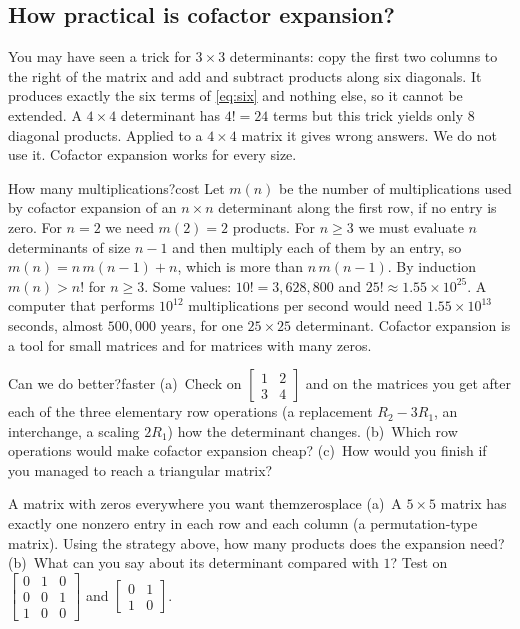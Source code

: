 \documentclass[11pt]{article}
\begin{document}
\subsection*{How practical is cofactor expansion?}

\begin{warn}
You may have seen a trick for $3\times3$ determinants: copy the first two columns to the right of the matrix and add and subtract products along six diagonals. It produces exactly the six terms of \eqref{eq:six} and nothing else, so it cannot be extended. A $4\times4$ determinant has $4!=24$ terms but this trick yields only $8$ diagonal products. Applied to a $4\times4$ matrix it gives wrong answers. We do not use it. Cofactor expansion works for every size.
\end{warn}

\begin{exmp}{How many multiplications?}{cost}
Let $m(n)$ be the number of multiplications used by cofactor expansion of an $n\times n$ determinant along the first row, if no entry is zero. For $n=2$ we need $m(2)=2$ products. For $n\geq3$ we must evaluate $n$ determinants of size $n-1$ and then multiply each of them by an entry, so $m(n)=n\,m(n-1)+n$, which is more than $n\,m(n-1)$. By induction $m(n)>n!$ for $n\geq3$. Some values: $10!=3{,}628{,}800$ and $25!\approx1.55\times10^{25}$. A computer that performs $10^{12}$ multiplications per second would need $1.55\times10^{13}$ seconds, almost $500{,}000$ years, for one $25\times25$ determinant. Cofactor expansion is a tool for small matrices and for matrices with many zeros.
\end{exmp}

\begin{think}{Can we do better?}{faster}
(a)~Check on $\begin{bmatrix}1&2\\3&4\end{bmatrix}$ and on the matrices you get after each of the three elementary row operations (a replacement $R_2-3R_1$, an interchange, a scaling $2R_1$) how the determinant changes. (b)~Which row operations would make cofactor expansion cheap? (c)~How would you finish if you managed to reach a triangular matrix?
\end{think}

\begin{think}{A matrix with zeros everywhere you want them}{zerosplace}
(a)~A $5\times5$ matrix has exactly one nonzero entry in each row and each column (a permutation-type matrix). Using the strategy above, how many products does the expansion need? (b)~What can you say about its determinant compared with $1$? Test on $\begin{bmatrix}0&1&0\\0&0&1\\1&0&0\end{bmatrix}$ and $\begin{bmatrix}0&1\\1&0\end{bmatrix}$.
\end{think}
\end{document}
